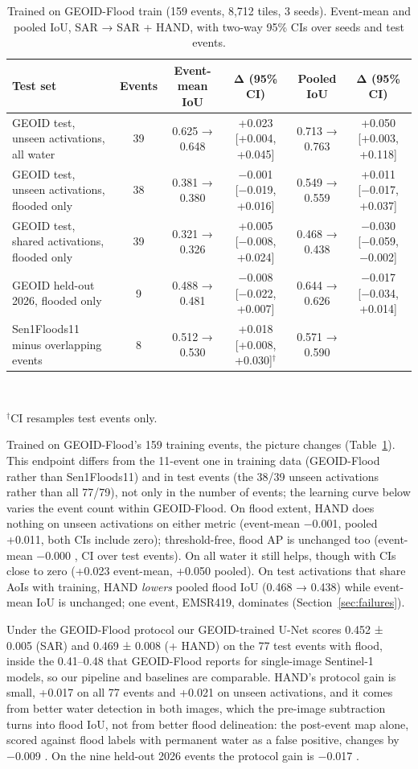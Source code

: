 \begin{table}[t]
\caption{Trained on GEOID-Flood train (159 events, 8,712 tiles, 3 seeds). Event-mean and pooled IoU,
SAR → SAR + HAND, with two-way 95\% CIs over seeds and test events.}
\label{tab:geoid}
\centering
\footnotesize
\begin{tabular}{@{}lccccc@{}}
\toprule
Test set & Events & Event-mean IoU & Δ (95\% CI) & Pooled IoU & Δ (95\% CI) \\
\midrule
GEOID test, unseen activations, all water & 39 & 0.625 → 0.648 & +0.023 [+0.004, +0.045] & 0.713 → 0.763 & +0.050 [+0.003, +0.118] \\
GEOID test, unseen activations, flooded only & 38 & 0.381 → 0.380 & −0.001 [−0.019, +0.016] & 0.549 → 0.559 & +0.011 [−0.017, +0.037] \\
GEOID test, shared activations, flooded only & 39 & 0.321 → 0.326 & +0.005 [−0.008, +0.024] & 0.468 → 0.438 & −0.030 [−0.059, −0.002] \\
GEOID held-out 2026, flooded only & 9 & 0.488 → 0.481 & −0.008 [−0.022, +0.007] & 0.644 → 0.626 & −0.017 [−0.034, +0.014] \\
Sen1Floods11 minus overlapping events & 8 & 0.512 → 0.530 & +0.018 [+0.008, +0.030]$^\dagger$ & 0.571 → 0.590 & \\
\bottomrule
\end{tabular}
\\[2pt]\raggedright\footnotesize $^\dagger$CI resamples test events only.
\end{table}

Trained on GEOID-Flood's 159 training events, the picture changes (Table~\ref{tab:geoid}). This endpoint
differs from the 11-event one in training data (GEOID-Flood rather than Sen1Floods11) and in test events
(the 38/39 unseen activations rather than all 77/79), not only in the number of events; the learning curve
below varies the event count within GEOID-Flood. On flood
extent, HAND does nothing on unseen activations on either metric (event-mean −0.001, pooled +0.011, both
CIs include zero); threshold-free, flood AP is unchanged too (event-mean −0.000 , CI over test events). On
all water it still helps, though with CIs close to zero (+0.023  event-mean, +0.050
 pooled). On test activations that share AoIs with training, HAND \emph{lowers} pooled
flood IoU (0.468 → 0.438) while event-mean IoU is unchanged; one event, EMSR419, dominates
(Section~\ref{sec:failures}).

Under the GEOID-Flood protocol our GEOID-trained U-Net scores \iouf{} 0.452 ± 0.005 (SAR) and 0.469 ±
0.008 (+ HAND) on the 77 test events with flood, inside the 0.41--0.48 that GEOID-Flood reports for
single-image Sentinel-1 models, so our pipeline and baselines are comparable. HAND's protocol gain is
small, +0.017  on all 77 events and +0.021  on unseen activations,
and it comes from better water detection in both images, which the pre-image subtraction turns into flood
IoU, not from better flood delineation: the post-event map alone, scored against flood labels with
permanent water as a false positive, changes by −0.009 . On
the nine held-out 2026 events the protocol gain is −0.017 .


